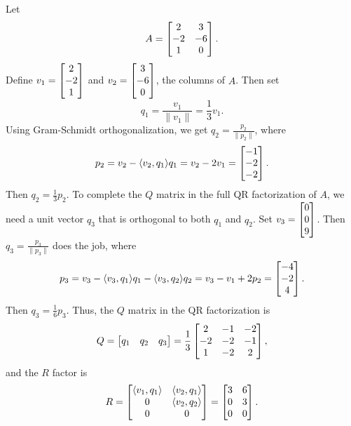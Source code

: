 \documentclass{homework}
\begin{document}
	\maketitle
	
	\question
	\begin{alphaparts}
		\questionpart Let
		\begin{equation*}
			A = \left[\begin{matrix}2 & 3 \\-2 & -6 \\ 1 & 0\end{matrix}\right].
		\end{equation*}
		Define $v_1 = \left[\begin{matrix}2\\-2\\1\end{matrix}\right]$ and $v_2 = \left[\begin{matrix}3 \\ -6 \\ 0\end{matrix}\right]$, the columns of $A$. Then set
		\begin{equation*}
			q_1 = \frac{v_1}{\lVert{v_1}\rVert} = \frac{1}{3}v_1.
		\end{equation*}
		Using Gram-Schmidt orthogonalization, we get $q_2 = \frac{p_2}{\lVert p_2\rVert}$, where
		\begin{equation*}
			p_2 = v_2 - \langle v_2, q_1\rangle q_1 = v_2 - 2v_1 = \left[\begin{matrix}-1 \\ -2 \\ -2\end{matrix}\right].
		\end{equation*}
		Then $q_2 = \frac{1}{3}p_2$. To complete the $Q$ matrix in the full QR factorization of $A$, we need a unit vector $q_3$ that is orthogonal to both $q_1$ and $q_2$. Set $v_3 = \left[\begin{matrix}0\\0\\9\end{matrix}\right]$. Then $q_3 = \frac{p_3}{\lVert p_3\rVert}$ does the job, where
		\begin{equation*}
			p_3 = v_3 - \langle v_3, q_1\rangle q_1 - \langle v_3, q_2\rangle q_2 = v_3 - v_1 + 2p_2 = \left[\begin{matrix}-4 \\ -2 \\ 4\end{matrix}\right].
		\end{equation*}
		Then $q_3 = \frac{1}{6}p_3$. Thus, the $Q$ matrix in the QR factorization is
		\begin{equation*}
			Q = \left[\begin{matrix}q_1 & q_2 & q_3\end{matrix}\right] = \frac{1}{3}\left[\begin{matrix}2 & -1 & -2 \\ -2 & -2 & -1 \\ 1 & -2 & 2\end{matrix}\right],
		\end{equation*}
		and the $R$ factor is
		\begin{equation*}
			R = \left[\begin{matrix}\langle v_1, q_1 \rangle & \langle v_2, q_1 \rangle \\ 0 & \langle v_2, q_2 \rangle \\ 0 & 0\end{matrix}\right] = \left[\begin{matrix}3 & 6 \\ 0 & 3 \\0 & 0\end{matrix}\right].
		\end{equation*}
		

\end{alphaparts}
\end{document}

